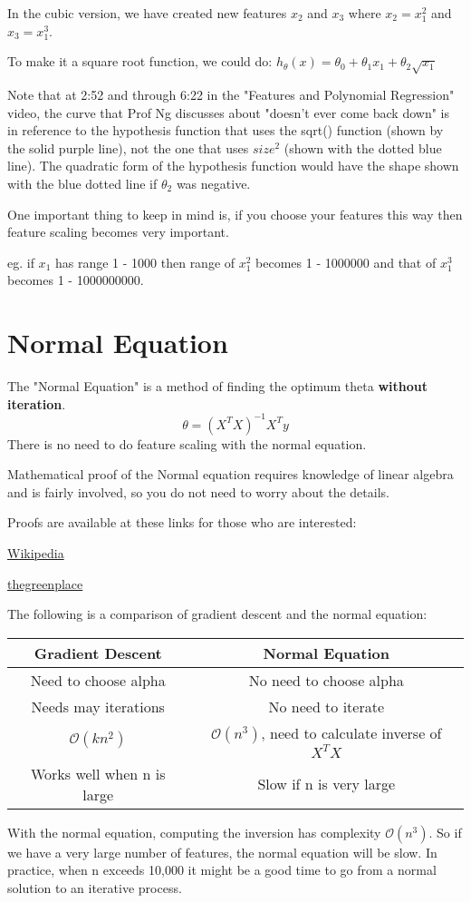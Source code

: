In the cubic version, we have created new features $x_2$ and $x_3$ where $x_2 = x_1^2$ and $x_3 = x_1^3$.

To make it a square root function, we could do: $h_\theta(x) = \theta_0 + \theta_1 x_1 + \theta_2 \sqrt{x_1}$

Note that at 2:52 and through 6:22 in the "Features and Polynomial Regression" video, the curve that Prof Ng discusses about "doesn't ever come back down" is in reference to the hypothesis function that uses the sqrt() function (shown by the solid purple line), not the one that uses $size^2$ (shown with the dotted blue line). The quadratic form of the hypothesis function would have the shape shown with the blue dotted line if $\theta_2$ was negative.

One important thing to keep in mind is, if you choose your features this way then feature scaling becomes very important.

eg. if $x_1$ has range 1 - 1000 then range of $x_1^2$ becomes 1 - 1000000 and that of $x_1^3$ becomes 1 - 1000000000.
\section{Normal Equation}
The "Normal Equation" is a method of finding the optimum theta {\bf without iteration}.
\begin{equation}
\theta=(X^TX)^{-1}X^Ty
\end{equation}
There is no need to do feature scaling with the normal equation.

Mathematical proof of the Normal equation requires knowledge of linear algebra and is fairly involved, so you do not need to worry about the details.

Proofs are available at these links for those who are interested:

\href{https://en.wikipedia.org/wiki/Linear_least_squares_(mathematics)}{Wikipedia}

\href{http://eli.thegreenplace.net/2014/derivation-of-the-normal-equation-for-linear-regression}{thegreenplace}

The following is a comparison of gradient descent and the normal equation:

\begin{center}
\begin{tabular}{|c|c|}
\hline 
{\bf Gradient Descent} & {\bf Normal Equation} \\ 
\hline 
Need to choose alpha & No need to choose alpha \\ 
\hline 
Needs may iterations & No need to iterate \\ 
\hline 
$\mathcal{O}(kn^2)$ & $\mathcal{O}(n^3)$, need to calculate inverse of $X^TX$ \\ 
\hline 
Works well when n is large & Slow if n is very large \\ 
\hline 
\end{tabular} 
\end{center}
With the normal equation, computing the inversion has complexity $\mathcal{O}(n^3)$. So if we have a very large number of features, the normal equation will be slow. In practice, when n exceeds 10,000 it might be a good time to go from a normal solution to an iterative process.
